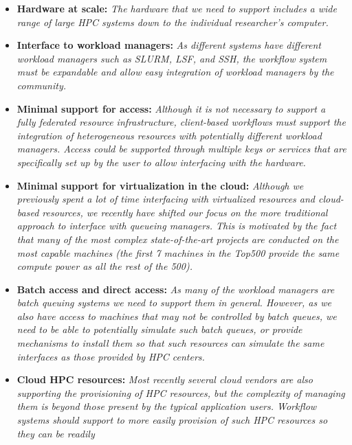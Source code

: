 \documentclass[utf8]{FrontiersinVancouver} %
\begin{document}
\begin{BOX}

\begin{itemize}
\item {\bf Hardware at scale:} {\it The hardware that we need to
    support includes a wide range of large HPC systems down to the individual researcher's computer.}
\item {\bf Interface to workload managers:} {\it As different systems
    have different workload managers such as SLURM, LSF, and SSH, the workflow system must be expandable and allow easy
    integration of workload managers by the community.}  
\item {\bf Minimal support for access:} {\it Although it is not
    necessary to support a fully federated resource infrastructure,
    client-based workflows must support the integration of
    heterogeneous resources with potentially different workload
    managers. Access could be supported through multiple keys or
    services that are specifically set up by the user to allow
    interfacing with the hardware.}
\item {\bf Minimal support for virtualization in the cloud:} {\it Although we
    previously spent a lot of time interfacing with virtualized
    resources and cloud-based resources, we recently have shifted our
    focus on the more traditional approach to interface with queueing
    managers. This is motivated by the fact that many of the
    most complex state-of-the-art projects are conducted on the most
    capable machines (the first 7 machines in the Top500 provide the
    same compute power as all the rest of the 500).}
\item {\bf Batch access and direct access:} {\it As many of the
    workload managers are batch queuing systems we need to support
    them in general. However, as we also have access to machines that
    may not be controlled by batch queues, we need to be able to
    potentially simulate such batch queues, or provide mechanisms to
    install them so that such resources can simulate the same
    interfaces as those provided by HPC centers.}
 \item {\bf Cloud HPC resources:} {\it Most recently several cloud
     vendors are also supporting the provisioning of HPC resources,
     but the complexity of managing them is beyond those present by the
     typical application users. Workflow systems should support to
     more easily provision of such HPC resources so they can be readily
}
\end{itemize}
\end{BOX}
\end{document}
